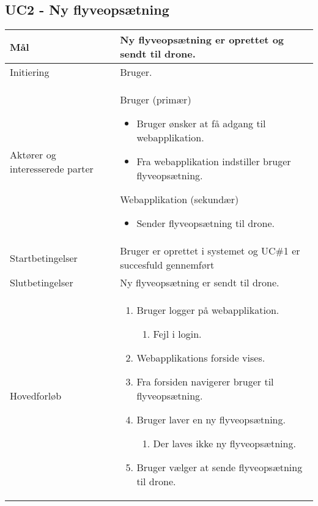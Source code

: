 \subsection*{UC2 - Ny flyveopsætning}

\begin{table}[H]
\begin{tabular}{|l|p{10cm}|}
\hline

Mål	 							& Ny flyveopsætning er oprettet og sendt til drone. \\\hline
Initiering							& Bruger. \\\hline
Aktører og interesserede parter			& Bruger (primær) 
										\begin{itemize}
											\item Bruger ønsker at få adgang til webapplikation.
											\item Fra webapplikation indstiller bruger flyveopsætning.
										\end{itemize}
									  Webapplikation (sekundær)
										\begin{itemize}
											\item Sender flyveopsætning til drone.
										\end{itemize} \\\hline
Startbetingelser						& Bruger er oprettet i systemet og UC\#1 er succesfuld gennemført  \\\hline
Slutbetingelser						& Ny flyveopsætning er sendt til drone. \\\hline
Hovedforløb				&
 
									\renewcommand{\labelenumi}{\arabic{enumi}.}
									\renewcommand{\labelenumii}{\Roman{enumii}:}

									\begin{enumerate}[topsep=0.0cm, leftmargin=0.5cm]
										\item Bruger logger på webapplikation.
										\begin{enumerate}[partopsep=4cm, topsep=0cm, leftmargin=1cm]
												\item Fejl i login.
										\end{enumerate}
										\item Webapplikations forside vises.
										\item Fra forsiden navigerer bruger til flyveopsætning.
										\item Bruger laver en ny flyveopsætning.
										\begin{enumerate}[partopsep=4cm, topsep=0cm, leftmargin=1cm]
												\item Der laves ikke ny flyveopsætning.
										\end{enumerate}
										\item Bruger vælger at sende flyveopsætning til drone.
									\end{enumerate} \\\hline	


\end{tabular}
\end{table}
